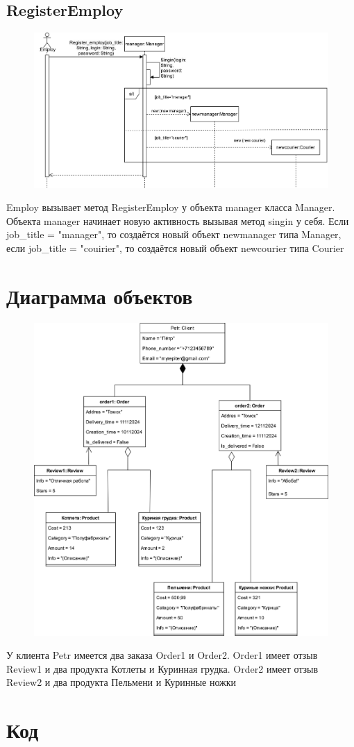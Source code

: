 \documentclass[a4paper]{report}
\begin{document}
\subsection{RegisterEmploy}
\begin{figure}[H]
    \centering
    \includegraphics[width=\textwidth]{Диаграмма последовательностей register_employ.png}
\end{figure}
Employ вызывает метод RegisterEmploy у объекта manager класса Manager. Объекта manager начинает новую активность вызывая метод singin у себя. Если job\_title = "manager", то создаётся новый объект newmanager типа Manager, если job\_title = "couirier", то создаётся новый объект newcourier типа Courier

\newpage
\section{Диаграмма объектов}
\begin{figure}[H]
    \centering
    \includegraphics[width=\textwidth]{Диаграмма объектов.png}
\end{figure}
У клиента Petr имеется два заказа Order1 и Order2. Order1 имеет отзыв Review1 и два продукта Котлеты и Куринная грудка. Order2 имеет отзыв Review2 и два продукта Пельмени и Куринные ножки
\newpage
\section{Код}
\inputminted[breaklines]{cs}{main.cs}
\end{document}
